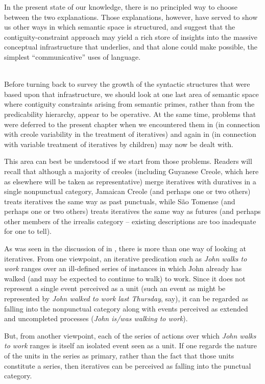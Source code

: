 In the present state of our knowledge, there is no principled way to choose between the two explanations. Those explanations, however, have served to show us other ways in which semantic space is struc\-tured, and suggest that the contiguity-constraint approach may yield a rich store of insights into the massive conceptual infrastructure that underlies, and that alone could make possible, the simplest ``communi\-cative'' uses of language.\\\\

Before turning back to survey the growth of the syntactic struc\-tures that were based upon that infrastructure, we should look at one last area of semantic space where contiguity constraints arising from semantic primes, rather than from the predicability hierarchy, appear to be operative. At the same time, problems that were deferred to the present chapter when we encountered them in  (in connection with creole variability in the treatment of iteratives) and again in  (in connection with variable treatment of iteratives by children) may now be dealt with.

This area can best be understood if we start from those problems. Readers will recall that although a majority of creoles (including Guyanese Creole, which here as elsewhere will be taken as representative) merge iteratives with duratives in a single nonpunctual category,
Jamaican Creole (and perhaps one or two others) treats iteratives the same way as past punctuals, while S{\~a}o Tomense (and perhaps one or two others) treats iteratives the same way as futures (and perhaps other members of the irrealis category -- existing descriptions are too inadequate for one to tell).

As was seen in the discussion of \citet{BrockartEtAl1973} in , there is more than one way of looking at iteratives. From one viewpoint, an iterative predication such as \textit{John walks to work} ranges over an ill-defined series of instances in which John already has walked (and may be expected to continue to walk) to work. Since it does not represent a single event perceived as a unit (such an event as might be represented by \textit{John walked to work last Thursday}, say), it can be regarded as falling into the nonpunctual category along with events perceived as extended and uncompleted processes (\textit{John is/was walking to work}).

But, from another viewpoint, each of the series of actions over which \textit{John walks to work} ranges is itself an isolated event seen as a unit. If one regards the nature of the units in the series as primary, rather than the fact that those units constitute a series, then iteratives can be perceived as falling into the punctual category.

